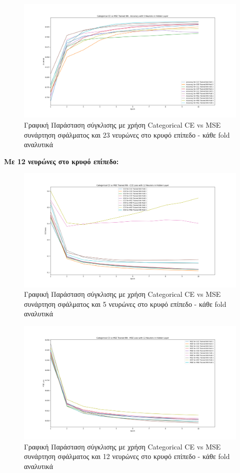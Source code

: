 \documentclass[12pt,a4paper]{article}
\begin{document}
\begin{figure}[H]
	\includegraphics[width=\textwidth]{3. CCE vs MSE - Accuracy - 5 Neurons.png}
	\caption{Γραφική Παράσταση σύγκλισης με χρήση Categorical CE vs MSE συνάρτηση σφάλματος και 23 νευρώνες στο κρυφό επίπεδο - κάθε fold αναλυτικά}
\end{figure}

\textbf{Με 12 νευρώνες στο κρυφό επίπεδο:}

\begin{figure}[H]
	\includegraphics[width=\textwidth]{4. CCE vs MSE - CCE Loss - 12 Neurons.png}
	\caption{Γραφική Παράσταση σύγκλισης με χρήση Categorical CE vs MSE συνάρτηση σφάλματος και 5 νευρώνες στο κρυφό επίπεδο - κάθε fold αναλυτικά}
\end{figure}

\begin{figure}[H]
	\includegraphics[width=\textwidth]{5. CCE vs MSE - MSE Loss - 12 Neurons.png}
	\caption{Γραφική Παράσταση σύγκλισης με χρήση Categorical CE vs MSE συνάρτηση σφάλματος και 12 νευρώνες στο κρυφό επίπεδο - κάθε fold αναλυτικά}
\end{figure}
\end{document}
